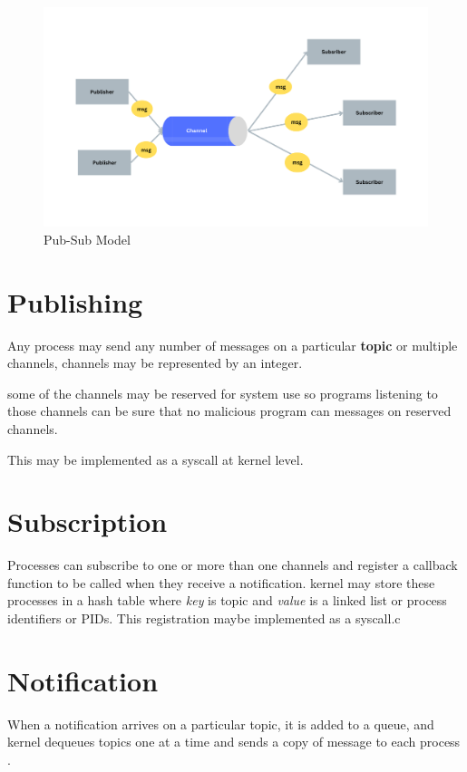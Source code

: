 \documentclass[12pt]{report}
\begin{document}
    \begin{figure}
    \begin{center}
    \includegraphics[width=15cm]{images/pub-sub.png}
    \end{center}
    \caption{Pub-Sub Model}
    \label{fig:fig1}
    \end{figure}

	\section{Publishing}
	Any process may send any number of messages on a particular \textbf{topic} or 
	multiple channels, channels may be represented by an integer.

	some of the channels may be reserved for system use so programs listening to those
	channels can be sure that no malicious program can messages on reserved channels.
	
	This may be implemented as a syscall at kernel level.
				 	
	\section{Subscription}
	Processes can subscribe to one or more than one channels and register a callback
	function to be called when they receive a notification.
	kernel may store these processes in a hash table where \textit{key} is topic 
	and \textit{value} is a linked list or process identifiers or PIDs.
	This registration maybe implemented as a syscall.c
		
	\section{Notification}
	When a notification arrives on a particular topic, it is added to a queue,
	and kernel dequeues topics one at a time and sends a copy of message to each 
	process \cite{citation04}.
	
\end{document}
